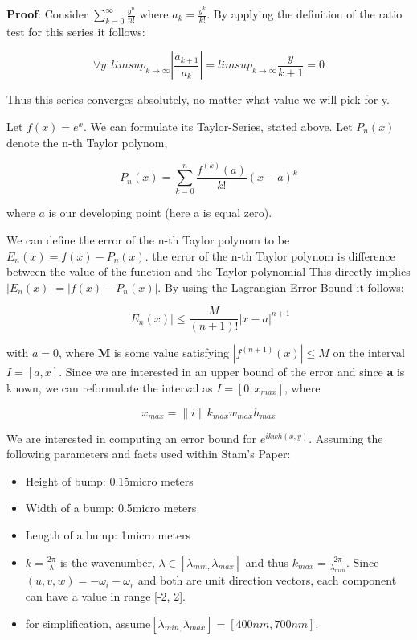\textbf{Proof}: Consider $\sum_{k=0}^{\infty}\frac{y^{n}}{n!}$ where
$a_{k}=\frac{y^{k}}{k!}$. By applying the definition of the ratio test for this series it follows: 

\begin{equation}
 \forall y:limsup_{k\rightarrow\infty}|\frac{a_{k+1}}{a_{k}}|=limsup_{k\rightarrow\infty}\frac{y}{k+1}=0 
\end{equation}

Thus this series converges absolutely, no matter what value we will
pick for y.

Let $f(x)=e^{x}$. We can formulate its Taylor-Series, stated above.
Let $P_{n}(x)$denote the n-th Taylor polynom, 

\begin{equation}
 P_{n}(x)=\sum_{k=0}^{n}\frac{f^{(k)}(a)}{k!}(x-a)^{k}
\end{equation}

where $a$ is our developing point (here a is equal zero). 

We can define the error of the n-th Taylor polynom to be $E_{n}(x)=f(x)-P_{n}(x)$.
the error of the n-th Taylor polynom is difference between the value of the function and the Taylor polynomial
This directly implies $|E_{n}(x)|=|f(x)-P_{n}(x)|$. By using the Lagrangian Error Bound it follows: 

\begin{equation}
 |E_{n}(x)|\leq\frac{M}{(n+1)!}|x-a|^{n+1} 
\end{equation}

with $a=0$, where \textbf{M} is some value satisfying $|f^{(n+1)}(x)|\leq M$ on the interval $I=[a,x]$. Since we are interested in an upper bound of the error and since \textbf{a} is known, we can reformulate the interval as $I=[0,x_{max}]$, where 

\begin{equation}
 x_{max} = \|i\| k_{max} w_{max} h_{max}
\end{equation}

We are interested in computing an error bound for $e^{ikwh(x,y)}$. Assuming the following parameters and facts used within Stam's Paper: 

\begin{itemize}
\item Height of bump: 0.15micro meters
\item Width of a bump: 0.5micro meters
\item Length of a bump: 1micro meters
\item $k=\frac{2\pi}{\lambda}$ is the wavenumber, $\lambda\in[\lambda_{min,}\lambda_{max}]$ and
thus $k_{max}=\frac{2\pi}{\lambda_{min}}$. Since $(u,v,w) = -\omega_i - \omega_r$ and both are unit direction vectors, 
each component can have a value in range {[}-2, 2{]}.
\item for simplification, assume$[\lambda_{min,}\lambda_{max}]=[400nm,700nm].$

\end{itemize}

